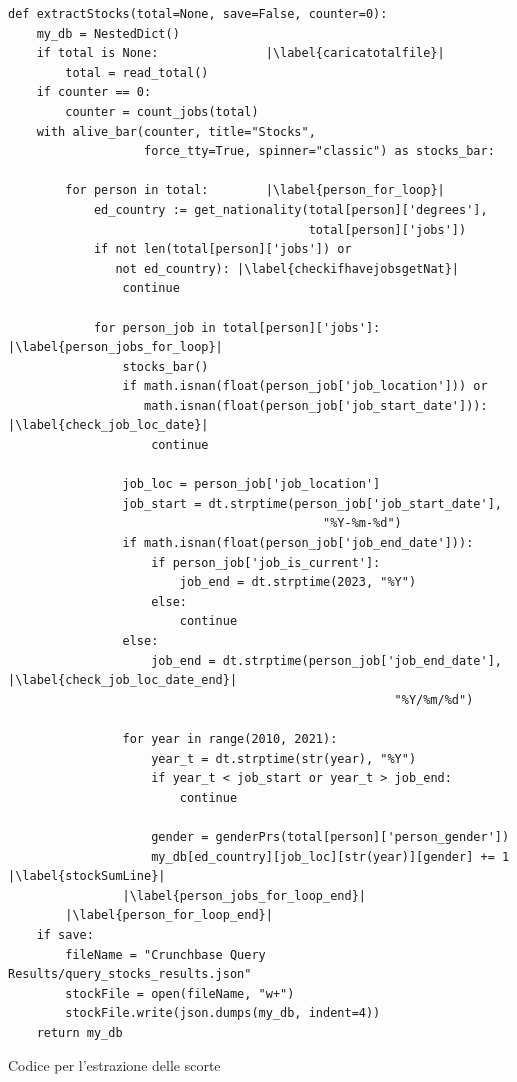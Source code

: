 \begin{listing}[htbp]
\begin{verbatim}
def extractStocks(total=None, save=False, counter=0):
    my_db = NestedDict()
    if total is None:               |\label{caricatotalfile}| 
        total = read_total()
    if counter == 0:
        counter = count_jobs(total)
    with alive_bar(counter, title="Stocks", 
                   force_tty=True, spinner="classic") as stocks_bar:

        for person in total:        |\label{person_for_loop}| 
            ed_country := get_nationality(total[person]['degrees'], 
                                          total[person]['jobs'])
            if not len(total[person]['jobs']) or 
               not ed_country): |\label{checkifhavejobsgetNat}|
                continue
                
            for person_job in total[person]['jobs']:  |\label{person_jobs_for_loop}| 
                stocks_bar()
                if math.isnan(float(person_job['job_location'])) or 
                   math.isnan(float(person_job['job_start_date'])):     |\label{check_job_loc_date}|
                    continue
                    
                job_loc = person_job['job_location']
                job_start = dt.strptime(person_job['job_start_date'], 
                                            "%Y-%m-%d")
                if math.isnan(float(person_job['job_end_date'])):
                    if person_job['job_is_current']:
                        job_end = dt.strptime(2023, "%Y")
                    else:
                        continue
                else:
                    job_end = dt.strptime(person_job['job_end_date'],   |\label{check_job_loc_date_end}|
                                                      "%Y/%m/%d")
                                                      
                for year in range(2010, 2021):
                    year_t = dt.strptime(str(year), "%Y")
                    if year_t < job_start or year_t > job_end:
                        continue
    
                    gender = genderPrs(total[person]['person_gender'])   
                    my_db[ed_country][job_loc][str(year)][gender] += 1 |\label{stockSumLine}|
                |\label{person_jobs_for_loop_end}| 
        |\label{person_for_loop_end}| 
    if save:
        fileName = "Crunchbase Query Results/query_stocks_results.json"
        stockFile = open(fileName, "w+")
        stockFile.write(json.dumps(my_db, indent=4))
    return my_db
\end{verbatim}
\caption{Codice per l'estrazione delle scorte}
\label{lst:stockget}
\end{listing}

